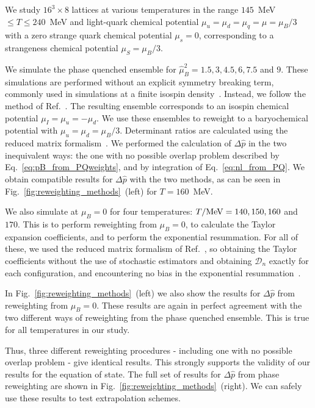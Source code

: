 \documentclass[twocolumn,showpacs,preprintnumbers,amsmath,amssymb,latexsym,prl,footinbib,floatfix,superscriptaddress]{revtex4-2}
\begin{document}
We study $16^3\times 8$ lattices at various temperatures in the 
range $145$~MeV $ \leq T\leq 240$~MeV and light-quark
chemical potential $\mu_u=\mu_d=\mu_q=\mu=\mu_B/3$ with a zero strange 
quark chemical potential $\mu_s=0$, corresponding to a strangeness 
chemical potential $\mu_S=\mu_B/3$.  

We simulate
the phase quenched ensemble 
for $\hat{\mu}_B^2 = 1.5,3,4.5,6,7.5$ and $9$.
These simulations are performed
without 
an explicit symmetry breaking term,
commonly used in simulations at a finite isospin 
density~\cite{Kogut:2002zg, Brandt:2017oyy}. 
Instead, we follow the method of Ref.~\cite{Borsanyi:2021hbk}. 
The resulting ensemble corresponds to an isospin chemical 
potential $\mu_I = \mu_u = - \mu_d$. We use these ensembles to 
reweight to a baryochemical potential with $\mu_u = \mu_d = \mu_B/3$.
Determinant ratios
are calculated 
using the reduced matrix formalism~\cite{Hasenfratz:1991ax,Giordano:2019gev}. 
We performed the calculation of $\Delta \hat{p}$ in the two inequivalent ways: the one with no possible overlap problem described by
Eq.~\eqref{eq:pB_from_PQweights}, and by integration of Eq.~\eqref{eq:nl_from_PQ}. We obtain  compatible results for $\Delta \hat{p}$ with the 
two methods, as can be seen in Fig.~\ref{fig:reweighting_methods}~(left) for $T=160$~MeV.

We also simulate at $\mu_B=0$ for four temperatures: $T/{\rm{MeV}}=140,150,160$ and $170$. This is to perform reweighting from $\mu_B=0$, 
to calculate the Taylor expansion coefficients, and to
perform the exponential resummation. 
For all of these, we used the reduced matrix formalism of Ref.~\cite{Hasenfratz:1991ax}, 
so obtaining the Taylor coefficients without the use
of stochastic estimators and obtaining $\mathcal{D}_n$ exactly for each
configuration, and encountering no bias in the
exponential resummation~\cite{Mondal:2021jxk,Mitra:2022vtf}.

In Fig.~\ref{fig:reweighting_methods}~(left)
we also show the results for $\Delta \hat{p}$ from reweighting from $\mu_B=0$.
These results are again in perfect agreement with the two different ways of reweighting from the phase quenched
ensemble. This is true for all temperatures in our study. 

Thus, three different reweighting procedures - including one with no 
possible overlap problem - give identical results. This strongly supports
the validity of our results for the equation of state. The full set of 
results for $\Delta \hat{p}$ from phase reweighting are shown in 
Fig.~\ref{fig:reweighting_methods}~(right). We can safely use these 
results to test extrapolation schemes. 
\end{document}
